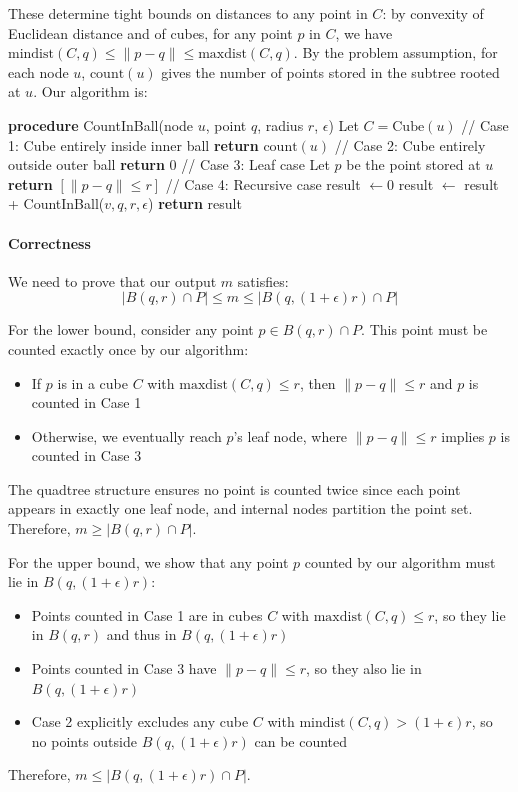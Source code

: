 \documentclass{article}
\begin{document}
These determine tight bounds on distances to any point in $C$: by convexity of Euclidean distance and of cubes, for any point $p$ in $C$, we have $\text{mindist}(C,q) \leq \|p-q\| \leq \text{maxdist}(C,q)$. By the problem assumption, for each node $u$, $\text{count}(u)$ gives the number of points stored in the subtree rooted at $u$. Our algorithm is:

\begin{algorithmic}[1]
\STATE \textbf{procedure} CountInBall(node $u$, point $q$, radius $r$, $\epsilon$)
\STATE Let $C = \text{Cube}(u)$
\STATE // Case 1: Cube entirely inside inner ball
   \STATE \textbf{return} $\text{count}(u)$
\ENDIF
\STATE // Case 2: Cube entirely outside outer ball
   \STATE \textbf{return} 0
\ENDIF
\STATE // Case 3: Leaf case
   \STATE Let $p$ be the point stored at $u$
   \STATE \textbf{return} $[\|p-q\| \leq r]$ 
\ENDIF
\STATE // Case 4: Recursive case
\STATE result $\gets 0$
   \STATE result $\gets$ result + CountInBall($v,q,r,\epsilon$)
\ENDFOR
\STATE \textbf{return} result
\end{algorithmic}

\paragraph{Correctness} We need to prove that our output $m$ satisfies:
\[
|B(q, r) \cap P| \leq m \leq |B(q, (1+\epsilon)r) \cap P|
\]

For the lower bound, consider any point $p \in B(q,r) \cap P$. This point must be counted exactly once by our algorithm:
\begin{itemize}
   \item If $p$ is in a cube $C$ with $\text{maxdist}(C,q) \leq r$, then $\|p-q\| \leq r$ and $p$ is counted in Case 1
   \item Otherwise, we eventually reach $p$'s leaf node, where $\|p-q\| \leq r$ implies $p$ is counted in Case 3
\end{itemize}
The quadtree structure ensures no point is counted twice since each point appears in exactly one leaf node, and internal nodes partition the point set. Therefore, $m \geq |B(q,r) \cap P|$.

For the upper bound, we show that any point $p$ counted by our algorithm must lie in $B(q,(1+\epsilon)r)$:
\begin{itemize}
   \item Points counted in Case 1 are in cubes $C$ with $\text{maxdist}(C,q) \leq r$, so they lie in $B(q,r)$ and thus in $B(q,(1+\epsilon)r)$
   \item Points counted in Case 3 have $\|p-q\| \leq r$, so they also lie in $B(q,(1+\epsilon)r)$
   \item Case 2 explicitly excludes any cube $C$ with $\text{mindist}(C,q) > (1+\epsilon)r$, so no points outside $B(q,(1+\epsilon)r)$ can be counted
\end{itemize}
Therefore, $m \leq |B(q,(1+\epsilon)r) \cap P|$.
\end{document}
